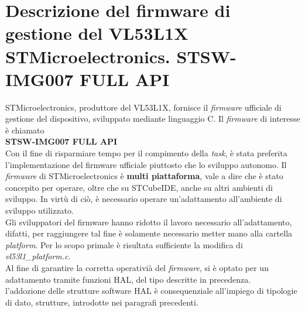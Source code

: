 \documentclass[11pt]{report}
\begin{document}
\section{Descrizione del firmware di gestione del VL53L1X STMicroelectronics. STSW-IMG007 FULL API}
STMicroelectronics, produttore del VL53L1X, fornisce il \textit{firmware} ufficiale di gestione del dispositivo, sviluppato mediante linguaggio C. Il \textit{firmware} di interesse è chiamato\\\textbf{STSW-IMG007 FULL API}\\
Con il fine di risparmiare tempo per il compimento della \textit{task}, è stata preferita l'implementazione del firmware ufficiale piuttosto che lo sviluppo autonomo.
Il \textit{firmware} di STMicroelectronics è \textbf{multi piattaforma}, vale a dire che è stato concepito per operare, oltre che su STCubeIDE, anche su altri ambienti di sviluppo.
In virtù di ciò, è necessario operare un'adattamento all'ambiente di sviluppo utilizzato.\\
Gli sviluppatori del firmware hanno ridotto il lavoro necessario all'adattamento, difatti, per raggiungere tal fine è solamente necessario metter mano alla cartella \textit{platform}. Per lo scopo primale è risultata sufficiente la modifica di \textit{vl53l1\_platform.c}.\\
Al fine di garantire la corretta operativià del \textit{firmware}, si è optato per un adattamento tramite funzioni HAL, del tipo descritte in precedenza.\\
l'addozione delle strutture software HAL è consequenziale all'impiego di tipologie di dato, strutture, introdotte nei paragrafi precedenti.
\end{document}
